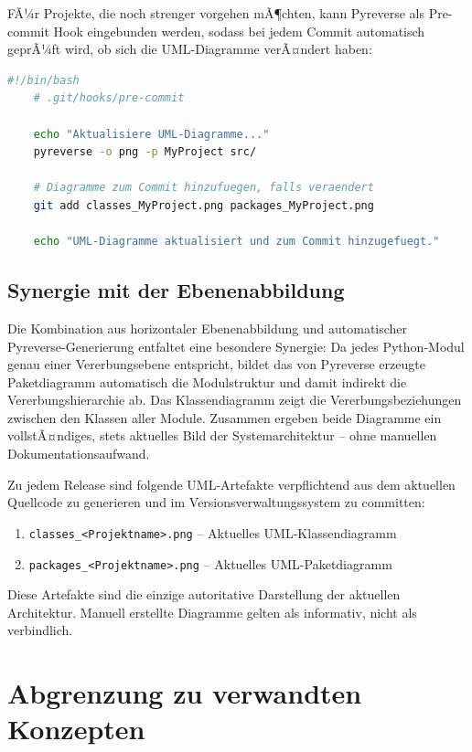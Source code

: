 ﻿\documentclass[a4paper,12pt]{article}
\begin{document}
FÃ¼r Projekte, die noch strenger vorgehen mÃ¶chten, kann Pyreverse als
Pre-commit Hook eingebunden werden, sodass bei jedem Commit automatisch
geprÃ¼ft wird, ob sich die UML-Diagramme verÃ¤ndert haben:

\begin{lstlisting}[language=bash, caption={Pre-commit Hook fuer Pyreverse},
	label={lst:precommit}]
	#!/bin/bash
	# .git/hooks/pre-commit
	
	echo "Aktualisiere UML-Diagramme..."
	pyreverse -o png -p MyProject src/
	
	# Diagramme zum Commit hinzufuegen, falls veraendert
	git add classes_MyProject.png packages_MyProject.png
	
	echo "UML-Diagramme aktualisiert und zum Commit hinzugefuegt."
\end{lstlisting}

\subsection{Synergie mit der Ebenenabbildung}

Die Kombination aus horizontaler Ebenenabbildung und automatischer
Pyreverse-Generie\-rung entfaltet eine besondere Synergie: Da jedes Python-Modul
genau einer Vererbungsebene entspricht, bildet das von Pyreverse erzeugte
Paketdiagramm automatisch die Modulstruktur und damit indirekt die
Vererbungshierarchie ab. Das Klassendiagramm zeigt die Vererbungsbeziehungen
zwischen den Klassen aller Module. Zusammen ergeben beide Diagramme ein
vollstÃ¤ndiges, stets aktuelles Bild der Systemarchitektur -- ohne manuellen
Dokumentationsaufwand.

Zu jedem Release sind folgende UML-Artefakte verpflichtend aus dem aktuellen
Quellcode zu generieren und im Versionsverwaltungssystem zu committen:
\begin{enumerate}
	\item \texttt{classes\_<Projektname>.png} -- Aktuelles UML-Klassendiagramm
	\item \texttt{packages\_<Projektname>.png} -- Aktuelles UML-Paketdiagramm
\end{enumerate}
Diese Artefakte sind die einzige autoritative Darstellung der aktuellen
Architektur. Manuell erstellte Diagramme gelten als informativ, nicht als
verbindlich.

\section{Abgrenzung zu verwandten Konzepten}
\end{document}
